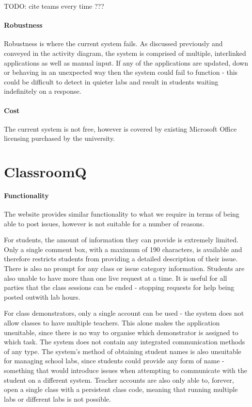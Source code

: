 TODO: cite teams every time ???

\paragraph{Robustness}
Robustness is where the current system fails. As discussed previously and conveyed in the activity diagram, the system is comprised of multiple, interlinked applications as well as manual input. If any of the applications are updated, down or behaving in an unexpected way then the system could fail to function - this could be difficult to detect in quieter labs and result in students waiting indefinitely on a response.


\paragraph{Cost}  
The current system is not free, however is covered by existing Microsoft Office licensing purchased by the university.  

\newpage
\section{ClassroomQ}

\paragraph{Functionality}
The website provides similar functionality to what we require in terms of being able to post issues, however is not suitable for a number of reasons.

For students, the amount of information they can provide is extremely limited. Only a single comment box, with a maximum of 190 characters, is available and therefore restricts students from providing a detailed description of their issue. There is also no prompt for any class or issue category information. Students are also unable to have more than one live request at a time. It is useful for all parties that the class sessions can be ended - stopping requests for help being posted outwith lab hours.

For class demonstrators, only a single account can be used - the system does not allow classes to have multiple teachers. This alone makes the application unsuitable, since there is no way to organise which demonstrator is assigned to which task. The system does not contain any integrated communication methods of any type. The system's method of obtaining student names is also unsuitable for managing school labs, since students could provide any form of name - something that would introduce issues when attempting to communicate with the student on a different system. Teacher accounts are also only able to, forever, open a single class with a persistent class code, meaning that running multiple labs or different labs is not possible.

